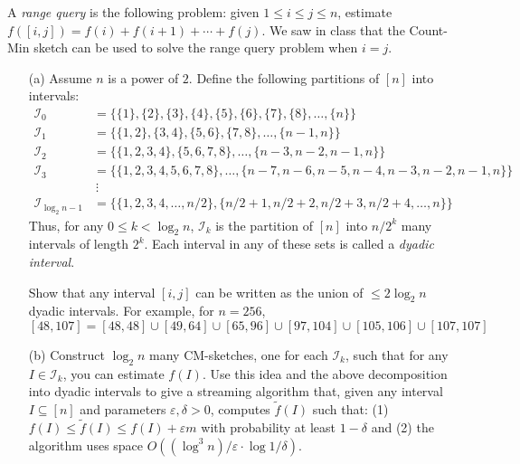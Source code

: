 \documentclass[11pt]{article}
\begin{document}
\begin{enumerate}
A {\em range query}
is the following problem: given $1\leq i \leq j\leq n$, estimate
$f([i,j]) = f(i)+f(i+1)+\cdots+f(j)$. We saw in class that the Count-Min sketch
can be used to solve the range query problem when $i=j$. 

\begin{itemize}
\item[(a)]Assume $n$ is a power of $2$. Define the following
  partitions of $[n]$ into intervals:
\begin{align*}
\mathcal{I}_0 &= \{\{1\}, \{2\}, \{3\}, \{4\}, \{5\}, \{6\}, \{7\},
\{8\}, \dots, \{n\}\}\\
\mathcal{I}_1 &= \{\{1,2\}, \{3,4\}, \{5,6\}, \{7,8\}, \dots, \{n-1,n\}\}\\
\mathcal{I}_2 &= \{\{1,2, 3,4\}, \{5,6,7,8\}, \dots, \{n-3, n-2,
n-1,n\}\}\\
\mathcal{I}_3 &= \{\{1,2, 3,4, 5,6,7,8\}, \dots,
\{n-7,n-6,n-5,n-4,n-3, n-2, n-1,n\}\}\\
~ &~\vdots\\
\mathcal{I}_{\log_2n-1} &= \{\{1,2,3,4,\dots,n/2\}, \{n/2+1,n/2+2,n/2+3,n/2+4,\dots,n\}\}
\end{align*}
Thus, for any $0\leq k < \log_2 n$, $\mathcal{I}_k$ is the
partition of $[n]$ into $n/2^k$ many intervals of length $2^k$. Each
interval in any of these sets is called a {\em dyadic interval}. 

Show that any interval $[i,j]$ can be written as the union of $\leq
2\log_2 n$ dyadic intervals. For example, for $n=256$,
$$[48,107]=[48,48]\cup [49,64] \cup [65,96]\cup [97,104]\cup
[105,106] \cup [107,107]$$

\item[(b)]
Construct $\log_2 n$ many CM-sketches, one for each $\mathcal{I}_k$,
such that for any $I \in \mathcal{I}_k$, you can estimate $f(I)$. Use
this idea and the above decomposition into dyadic intervals to give a
streaming algorithm that, given any interval $I \subseteq [n]$ and
parameters $\varepsilon, \delta > 0$, computes $\tilde{f}(I)$ such
that: (1)~$f(I) \leq \tilde{f}(I) \leq f(I) + \varepsilon m$ with
probability at least $1-\delta$ and (2) the algorithm uses space
$O((\log^3n)/\varepsilon \cdot \log 1/\delta)$.  
\end{itemize}
\end{enumerate}
\end{document}
